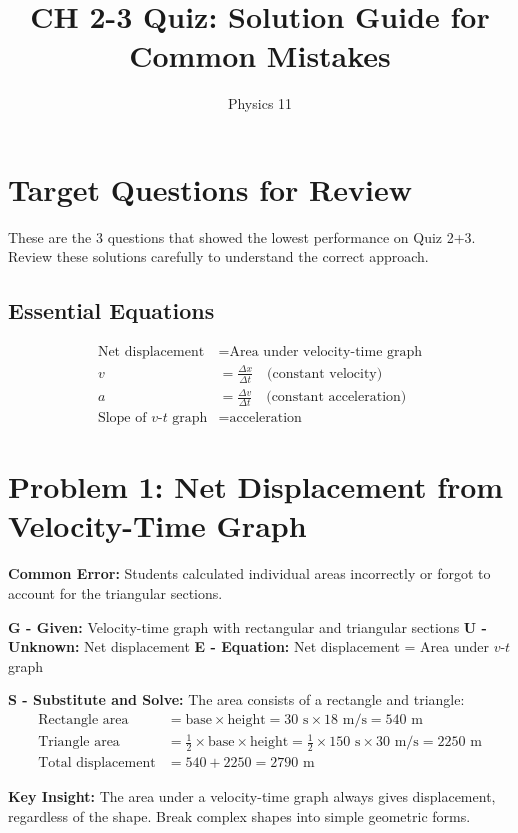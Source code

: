 \documentclass[12pt]{article}
\title{CH 2-3 Quiz: Solution Guide for Common Mistakes}
\author{Physics 11}
\date{}
\begin{document}
\maketitle

\section{Target Questions for Review}
These are the 3 questions that showed the lowest performance on Quiz 2+3. Review these solutions carefully to understand the correct approach.

\subsection{Essential Equations}
\begin{align}
\text{Net displacement} &= \text{Area under velocity-time graph} \\
v &= \frac{\Delta x}{\Delta t} \quad \text{(constant velocity)} \\
a &= \frac{\Delta v}{\Delta t} \quad \text{(constant acceleration)} \\
\text{Slope of } v\text{-}t \text{ graph} &= \text{acceleration}
\end{align}

\section{Problem 1: Net Displacement from Velocity-Time Graph}
\textbf{Common Error:} Students calculated individual areas incorrectly or forgot to account for the triangular sections.

\textbf{G - Given:} Velocity-time graph with rectangular and triangular sections
\textbf{U - Unknown:} Net displacement
\textbf{E - Equation:} Net displacement = Area under $v$-$t$ graph

\textbf{S - Substitute and Solve:}
The area consists of a rectangle and triangle:
\begin{align}
\text{Rectangle area} &= \text{base} \times \text{height} = 30 \text{ s} \times 18 \text{ m/s} = 540 \text{ m} \\
\text{Triangle area} &= \frac{1}{2} \times \text{base} \times \text{height} = \frac{1}{2} \times 150 \text{ s} \times 30 \text{ m/s} = 2250 \text{ m} \\
\text{Total displacement} &= 540 + 2250 = 2790 \text{ m}
\end{align}

\textbf{Key Insight:} The area under a velocity-time graph always gives displacement, regardless of the shape. Break complex shapes into simple geometric forms.
\end{document}
